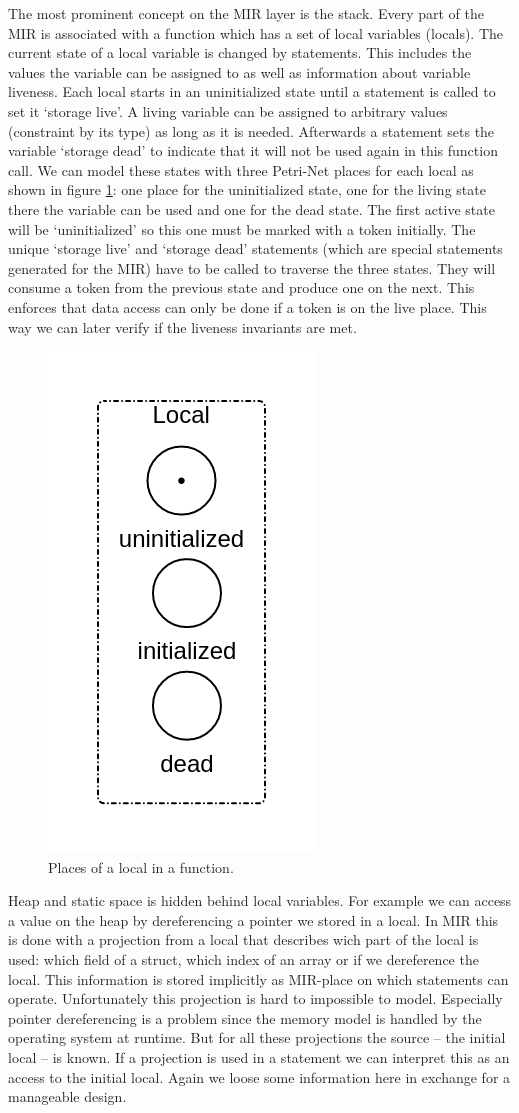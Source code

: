 The most prominent concept on the MIR layer is the stack.
Every part of the MIR is associated with a function which has a set of local variables (locals).
The current state of a local variable is changed by statements.
This includes the values the variable can be assigned to as well as information about variable liveness.
Each local starts in an uninitialized state until a statement is called to set it `storage live'.
A living variable can be assigned to arbitrary values (constraint by its type) as long as it is needed.
Afterwards a statement sets the variable `storage dead' to indicate that it will not be used again in this function call.
We can model these states with three Petri-Net places for each local as shown in figure \ref{local}: one place for the uninitialized state, one for the living state there the variable can be used and one for the dead state.
The first active state will be `uninitialized' so this one must be marked with a token initially.
The unique `storage live' and `storage dead' statements (which are special statements generated for the MIR) have to be called to traverse the three states.
They will consume a token from the previous state and produce one on the next.
This enforces that data access can only be done if a token is on the live place.
This way we can later verify if the liveness invariants are met.
\begin{figure}
    \centering
    \includegraphics[width=.2\textwidth]{../diagrams/local.png}
    \caption{Places of a local in a function.}
    \label{local}
\end{figure}

Heap and static space is hidden behind local variables.
For example we can access a value on the heap by dereferencing a pointer we stored in a local.
In MIR this is done with a projection from a local that describes wich part of the local is used:
which field of a struct, which index of an array or if we dereference the local.
This information is stored implicitly as MIR-place on which statements can operate.
Unfortunately this projection is hard to impossible to model.
Especially pointer dereferencing is a problem since the memory model is handled by the operating system at runtime.
But for all these projections the source -- the initial local -- is known.
If a projection is used in a statement we can interpret this as an access to the initial local.
Again we loose some information here in exchange for a manageable design.

